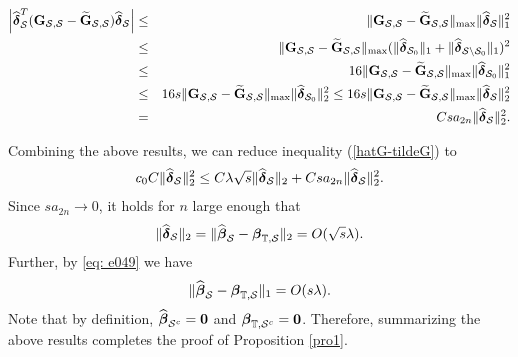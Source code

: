 \documentclass[11pt]{article}
\newcommand{\bG}{\mbox{\bf G}}
\newcommand{\bzero}{\mbox{\bf 0}}
\newcommand{\bbeta}{\mbox{\boldmath $\beta$}}
\newcommand{\bdelta}{\mbox{\boldmath $\delta$}}
\newcommand{\wh}{\widehat}
\begin{document}
		\begin{eqnarray}\nonumber
		\Big|\widehat{\bdelta}_\mathcal{S}^T({\bG}_{\mathcal{S},\mathcal{S}}-\widetilde{\bG}_{\mathcal{S},\mathcal{S}})\widehat{\bdelta}_\mathcal{S}\Big|&\le& \|{\bG}_{\mathcal{S},\mathcal{S}}-\widetilde{\bG}_{\mathcal{S},\mathcal{S}}\|_{\max}\|\widehat{\bdelta}_\mathcal{S}\|_1^2\\\nonumber
		&\le&\|{\bG}_{\mathcal{S},\mathcal{S}}-\widetilde{\bG}_{\mathcal{S},\mathcal{S}}\|_{\max}(\|\widehat{\bdelta}_{\mathcal{S}_0}\|_1+\|\widehat{\bdelta}_{\mathcal{S}\setminus\mathcal{S}_0}\|_1)^2\\\nonumber
		&\le&16\|{\bG}_{\mathcal{S},\mathcal{S}}-\widetilde{\bG}_{\mathcal{S},\mathcal{S}}\|_{\max}\|\widehat{\bdelta}_{\mathcal{S}_0}\|_1^2\\\nonumber
		&\le&16s\|{\bG}_{\mathcal{S},\mathcal{S}}-\widetilde{\bG}_{\mathcal{S},\mathcal{S}}\|_{\max}\|\widehat{\bdelta}_{\mathcal{S}_0}\|_2^2\le 16s\|{\bG}_{\mathcal{S},\mathcal{S}}-\widetilde{\bG}_{\mathcal{S},\mathcal{S}}\|_{\max}\|\widehat{\bdelta}_{\mathcal{S}}\|_2^2\\\nonumber
		&=&Csa_{2n}\|\widehat{\bdelta}_{\mathcal{S}}\|_2^2.
		\end{eqnarray}
		
Combining the above results, we can reduce inequality (\ref{hatG-tildeG}) to
		\begin{align*}
		c_0C\|\wh{\bdelta}_\mathcal{S}\|_2^2 \leq C\lambda\sqrt{s}\|\wh{\bdelta}_\mathcal{S}\|_2 + Csa_{2n}\|\wh{\bdelta}_\mathcal{S}\|_2^2.
		\end{align*}
		Since $sa_{2n}\rightarrow 0$, it holds for $n$ large enough that
		\begin{eqnarray*}
			\|\wh{\bdelta}_\mathcal{S}\|_2 = \|\widehat{\bbeta}_\mathcal{S}-\bbeta_{\mathbb{T},\mathcal{S}}\|_2=O(\sqrt{s}\lambda).
		\end{eqnarray*}
Further, by \eqref{eq: e049} we have
		\begin{align*}
		\|\widehat{\bbeta}_\mathcal{S}-\bbeta_{\mathbb{T},\mathcal{S}}\|_1=O(s\lambda).
		\end{align*}
Note that by definition, $\widehat{\bbeta}_{\mathcal{S}^c} = \bzero$ and $\bbeta_{\mathbb{T},\mathcal{S}^c}= \bzero$. Therefore, summarizing the above results completes the proof of Proposition \ref{pro1}.


%


\end{document}

